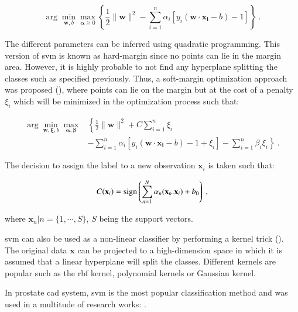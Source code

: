 \begin{enumerate}[leftmargin=*]
\begin{equation}
	\arg\min_{\mathbf{w},b } \max_{\boldsymbol{\alpha}\geq 0 } \left\{ \frac{1}{2}\|\mathbf{w}\|^2 - \sum_{i=1}^{n}{\alpha_i[y_i(\mathbf{w}\cdot \mathbf{x_i} - b)-1]} \right\} \ .
	\label{eq:svm2}
\end{equation}

The different parameters can be inferred using quadratic programming. This version of \ac{svm} is known as hard-margin since no points can lie in the margin area. However, it is highly probable to not find any hyperplane splitting the classes such as specified previously. Thus, a soft-margin optimization approach was proposed (\cite{Cortes1995}), where points can lie on the margin but at the cost of a penalty $\xi_i$ which will be minimized in the optimization process such that:

\begin{equation}
\begin{aligned}
\arg\min_{\mathbf{w},\mathbf{\xi}, b } \max_{\boldsymbol{\alpha},\boldsymbol{\beta} } & \left\{ \frac{1}{2}\|\mathbf{w}\|^2+C \sum_{i=1}^n \xi_i \right. \\
 & \left. - \sum_{i=1}^{n}{\alpha_i[y_i(\mathbf{w}\cdot \mathbf{x_i} - b) -1 + \xi_i]} - \sum_{i=1}^{n} \beta_i \xi_i \right\} \ .
\end{aligned}
\end{equation}

The decision to assign the label to a new observation $\mathbf{x}_i$ is taken such that:

\begin{equation}
	C(\mathbf{x}_i) = \operatorname*{sign} \left( \sum_{n=1}^{N} \alpha_n (\mathbf{x}_n . \mathbf{x}_i) + b_0 \right) \ ,
	\label{eq:svmdec} 
\end{equation}

\noindent where $\mathbf{x}_n|n=\{1,\cdots,S\}$, $S$ being the support vectors.

\ac{svm} can also be used as a non-linear classifier by performing a kernel trick (\cite{Boser1992}). The original data $\mathbf{x}$ can be projected to a high-dimension space in which it is assumed that a linear hyperplane will split the classes. Different kernels are popular such as the \ac{rbf} kernel, polynomial kernels or Gaussian kernel.

In prostate \ac{cad} system, \ac{svm} is the most popular classification method and was used in a multitude of research works: \cite{Artan2009,Artan2010,Chan2003,Kelm2007,Litjens2011,Litjens2012,Liu2013,Lopes2011,Niaf2011,Niaf2012,Ozer2009,Ozer2010,Parfait2012,Peng2013,Sung2011,Tiwari2012,Vos2008,Vos2008a,Vos2010,Vos2012}.


\end{enumerate}
